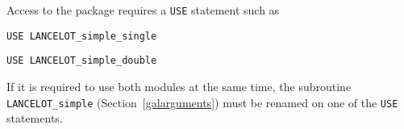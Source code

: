 \documentclass{galahad}
\newcommand{\fullpackagename}{LANC\-E\-LOT\-\_simple}
\begin{document}
Access to the package requires a {\tt USE} statement such as

\medskip{}

\hskip0.5in {\tt USE \fullpackagename\_single}

\medskip{}

\hskip0.5in {\tt USE  \fullpackagename\_double}

\medskip

\noindent
If it is required to use both modules at the same time,
the subroutine
{\tt \fullpackagename}
(Section~\ref{galarguments})
must be renamed on one of the {\tt USE} statements.


\galarguments
\end{document}

